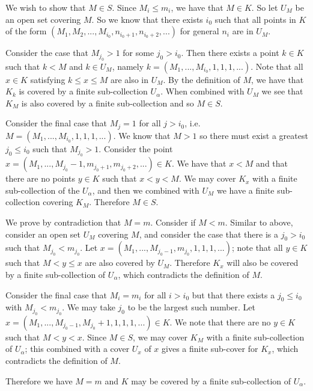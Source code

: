 We wish to show that \(M \in S\). Since \(M_i \leq m_i\), we have that \(M \in K\). So let \(U_M\) be an
open set covering \(M\). So we know that there exists \(i_0\) such that all
points in \(K\) of the form \((M_1, M_2, ..., M_{i_0}, n_{i_0+1}, n_{i_0 + 2}, ...)\) for
general \(n_i\) are in \(U_M\).  

Consider the case that \(M_{j_0} > 1\) for some \(j_0 > i_0\). Then there exists a point \(k \in K\) such that
\(k < M\) and \(k \in U_M\), namely \(k = (M_1, ..., M_{i_0}, 1, 1, 1, ...)\). Note that all \(x \in K\)
satisfying \(k \leq x \leq M\) are also in \(U_M\). By the definition of \(M\), we
have that \(K_k\) is covered by a finite sub-collection \(U_\alpha\). When combined with \(U_M\)
we see that \(K_M\) is also covered by a finite sub-collection and so \(M \in S\). 

Consider the final case that \(M_j = 1\) for all \(j > i_0\), i.e. \(M = (M_1, ..., M_{i_0}, 1, 1, 1, ...)\).
We know that \(M > 1\) so there must exist a greatest \(j_0 \leq i_0\) such that \(M_{j_0} > 1\). Consider
the point
\(x = (M_1, ..., M_{j_0}-1, m_{j_0 + 1}, m_{j_0 + 2}, ...) \in K\). We have that \(x < M\) and that there are
no points \(y \in K\) such that \(x < y < M\). We may cover \(K_x\) with a finite sub-collection of the
\(U_\alpha\), and then we combined with \(U_M\) we have a finite sub-collection covering \(K_M\). Therefore
\(M \in S\). 

We prove by contradiction that \(M = m\). Consider if \(M < m\). Similar to above, consider an open set
\(U_M\) covering \(M\), and consider the case that there is a \(j_0 > i_0\) such that \(M_{j_0} < m_{j_0}\).
Let \(x = (M_1, ..., M_{j_0 - 1}, m_{j_0}, 1, 1, 1, ...)\); note that all
\(y \in K\) such that \(M < y \leq x\) are also covered by \(U_M\). Therefore \(K_x\) will also be
covered by a finite sub-collection of \(U_\alpha\), which contradicts the definition of \(M\).

Consider the final case that \(M_i = m_i\) for all \(i > i_0\) but that there exists a \(j_0 \leq i_0\) with
\(M_{j_0} < m_{j_0}\). We may take \(j_0\) to be the largest such number. Let 
\(x = (M_1, ..., M_{j_0 - 1}, M_{j_0} + 1, 1, 1, 1, ...) \in K\). We note that there are no \(y \in K\) such
that \(M < y < x\). Since \(M \in S\), we may cover \(K_M\) with a finite sub-collection of \(U_\alpha\); this
combined with a cover \(U_x\) of \(x\) gives a finite sub-cover for \(K_x\), which contradicts the
definition of \(M\). 

Therefore we have \(M = m\) and \(K\) may be covered by a finite sub-collection of \(U_\alpha\).
